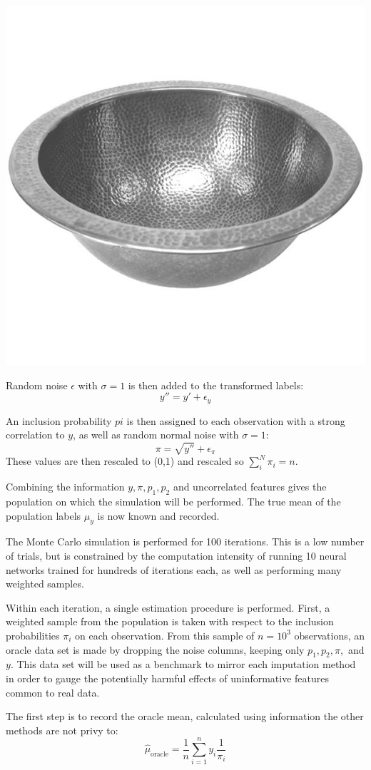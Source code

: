 \documentclass[12pt,twoside]{reedthesis}
\begin{document}
\includegraphics[width=0.7\linewidth]{figure/bowl}

Random noise \(\epsilon\) with \(\sigma = 1\) is then added to the
transformed labels: \[
y'' = y' + \epsilon_y
\]

An inclusion probability \(pi\) is then assigned to each observation
with a strong correlation to \(y\), as well as random normal noise with
\(\sigma = 1\): \[
\pi = \sqrt{y''} + \epsilon_\pi
\] These values are then rescaled to (0,1) and rescaled so
\(\sum_i^N \pi_i = n\).

Combining the information \(y,\pi, p_1, p_2\) and uncorrelated features
gives the population on which the simulation will be performed. The true
mean of the population labels \(\mu_y\) is now known and recorded.

The Monte Carlo simulation is performed for 100 iterations. This is a
low number of trials, but is constrained by the computation intensity of
running 10 neural networks trained for hundreds of iterations each, as
well as performing many weighted samples.

Within each iteration, a single estimation procedure is performed.
First, a weighted sample from the population is taken with respect to
the inclusion probabilities \(\pi_i\) on each observation. From this
sample of \(n=10^3\) observations, an oracle data set is made by
dropping the noise columns, keeping only \(p_1, p_2, \pi,\) and \(y\).
This data set will be used as a benchmark to mirror each imputation
method in order to gauge the potentially harmful effects of
uninformative features common to real data.

The first step is to record the oracle mean, calculated using
information the other methods are not privy to: \[
\hat \mu_{\text{oracle}} = \frac{1}{n} \sum_{i=1}^n y_i \frac{1}{\pi_i}
\]
\end{document}
